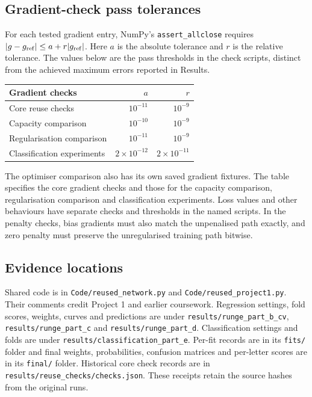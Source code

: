 \subsection{Gradient-check pass tolerances}
\label{app:check-tolerances}
For each tested gradient entry, NumPy's \nolinkurl{assert_allclose}
requires $|g-g_{\rm ref}|\leq a+r|g_{\rm ref}|$. Here $a$ is the
absolute tolerance and $r$ is the relative tolerance. The values below
are the pass thresholds in the check scripts, distinct from the
achieved maximum errors reported in Results.
\begin{center}
\begin{tabular}{lrr}
\toprule
Gradient checks & $a$ & $r$ \\
\midrule
Core reuse checks & $10^{-11}$ & $10^{-9}$ \\
Capacity comparison & $10^{-10}$ & $10^{-9}$ \\
Regularisation comparison & $10^{-11}$ & $10^{-9}$ \\
Classification experiments & $2\times10^{-12}$ & $2\times10^{-11}$ \\
\bottomrule
\end{tabular}
\end{center}
The optimiser comparison also has its own saved gradient fixtures. The table specifies the core gradient checks and those for the capacity
comparison, regularisation comparison and classification experiments. Loss values and other behaviours have separate checks and
thresholds in the named scripts. In the penalty checks, bias gradients
must also match the unpenalised path exactly, and zero penalty must
preserve the unregularised training path bitwise.


\subsection{Evidence locations}
Shared code is in \nolinkurl{Code/reused_network.py} and
\nolinkurl{Code/reused_project1.py}. Their comments credit Project 1 and
earlier coursework. Regression settings, fold scores, weights, curves and
predictions are under \nolinkurl{results/runge_part_b_cv},
\nolinkurl{results/runge_part_c} and \nolinkurl{results/runge_part_d}.
Classification settings and folds are under
\nolinkurl{results/classification_part_e}. Per-fit records are in its
\nolinkurl{fits/} folder and final weights, probabilities, confusion matrices
and per-letter scores are in its \nolinkurl{final/} folder.
Historical core check records are in \nolinkurl{results/reuse_checks/checks.json}.
These receipts retain the source hashes from the original runs.

